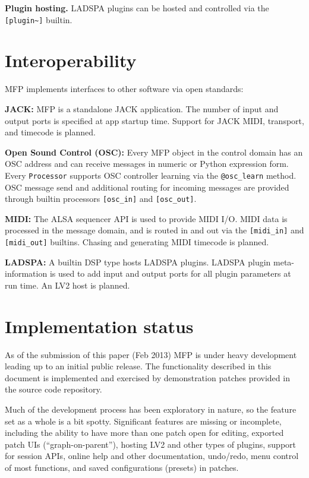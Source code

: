 \documentclass[11pt,a4paper]{article}
\begin{document}
\textbf{Plugin hosting.}  LADSPA plugins can be hosted and controlled via
the \texttt{[plugin\textasciitilde]} builtin.

\section{Interoperability} 

MFP implements interfaces to other software via open standards:

\textbf{JACK:}  MFP is a standalone JACK application.  The number of input
and output ports is specified at app startup time.   Support for JACK MIDI,
transport, and timecode is planned. 

\textbf{Open Sound Control (OSC):}  Every MFP object  in the control domain
has an OSC address and can receive messages in numeric or Python expression
form.  Every \texttt{Processor} supports OSC controller learning via the
\texttt{@osc\_learn} method. OSC message send and additional routing for
incoming messages are provided through builtin processors
\texttt{[osc\_in]} and \texttt{[osc\_out]}.

\textbf{MIDI:}  The ALSA sequencer API is used to provide MIDI I/O.  MIDI
data is processed in the message domain, and is routed in and out via the
\texttt{[midi\_in]} and \texttt{[midi\_out]} builtins.  Chasing and
generating MIDI timecode is planned. 

\textbf{LADSPA:}  A builtin DSP type hosts LADSPA plugins.  LADSPA plugin 
meta-information is used to add input and output ports for all plugin 
parameters at run time. An LV2 host is planned.  

\section{Implementation status}  

As of the submission of this paper (Feb 2013) MFP is under heavy
development leading up to an initial public release.  The functionality
described in this document is implemented and exercised by demonstration
patches provided in the source code repository. 

Much of the development process has been exploratory in nature, so the
feature set as a whole is a bit spotty.  Significant features are missing
or incomplete, including the ability to have more than one patch open for
editing, exported patch UIs (``graph-on-parent''), hosting LV2 and other
types of plugins, support for session APIs, online help and other
documentation, undo/redo, menu control of most functions, and saved
configurations (presets) in patches. 
\end{document}
